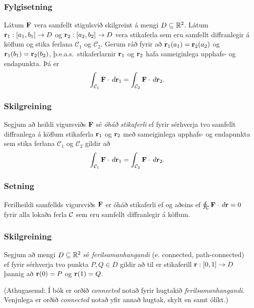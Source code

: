 \subsubsection{Fylgisetning \rtask{}}
Látum $\mbox{${\bf F}$}$ vera samfellt stigulsvið
skilgreint á mengi $D\subseteq {\mathbb R}^2$.   Látum
$\mbox{${\bf r}$}_1:[a_1,b_1]\rightarrow D$ og $\mbox{${\bf r}$}_2:[a_2,b_2]\rightarrow D$ vera
stikaferla sem eru samfellt diffranlegir á köflum og stika ferlana $\mathcal{C}_1$ og $\mathcal{C}_2$.  Gerum ráð fyrir
að $\mbox{${\bf r}$}_1(a_1)=\mbox{${\bf r}$}_2(a_2)$ og $\mbox{${\bf r}$}_1(b_1)=\mbox{${\bf r}$}_2(b_2)$, þ.e.a.s.\ stikaferlarnir $\mbox{${\bf r}$}_1$ og $\mbox{${\bf r}$}_2$ hafa sameiginlega upphafs- og endapunkta.   Þá er  
$$\int_{{\cal C}_1} \mbox{${\bf F}$}\cdot\,d\mbox{${\bf r}$}_1=\int_{{\cal C}_2} \mbox{${\bf F}$}\cdot\,d\mbox{${\bf r}$}_2.$$ 
 


\subsubsection{Skilgreining \rtask{}}
 Segjum að heildi vigursviðs $\mbox{${\bf F}$}$ sé {\em
  óháð stikaferli} ef fyrir sérhverja tvo samfellt diffranlega á
köflum stikaferla $\mbox{${\bf r}$}_1$ og $\mbox{${\bf r}$}_2$ með sameiginlega upphafs- og
endapunkta sem stika ferlana $\mathcal{C}_1$ og $\mathcal{C}_2$ gildir að  
$$\int_{{\cal C}_1} \mbox{${\bf F}$}\cdot\,d\mbox{${\bf r}$}_1=
\int_{{\cal C}_2} \mbox{${\bf F}$}\cdot\,d\mbox{${\bf r}$}_2.$$ 



\subsubsection{Setning }
  Ferilheildi samfellds vigursviðs $\mbox{${\bf F}$}$ er óháð
stikaferli ef og aðeins ef $\oint_{\cal C} \mbox{${\bf F}$}\cdot\,d\mbox{${\bf r}$}=0$ fyrir alla
lokaða ferla $\cal C$ sem eru samfellt diffranlegir á köflum. 



\subsubsection{Skilgreining \rtask{}}
   Segjum að mengi $D\subseteq {\mathbb R}^2$ sé {\em
  ferilsamanhangandi} (e. connected, path-connected)  ef fyrir
  sérhverja tvo punkta $P, Q\in D$ gildir 
að til er stikaferill $\mbox{${\bf r}$}:[0,1]\rightarrow D$ þannig að $\mbox{${\bf r}$}(0)=P$ og
$\mbox{${\bf r}$}(1)=Q$.

\bigskip
(Athugasemd:  Í bók er orðið {\em connected} notað fyrir hugtakið {\em
  ferilsamanhangandi}.  Venjulega er orðið {\em connected} notað yfir
  annað hugtak, skylt en samt ólíkt.)




